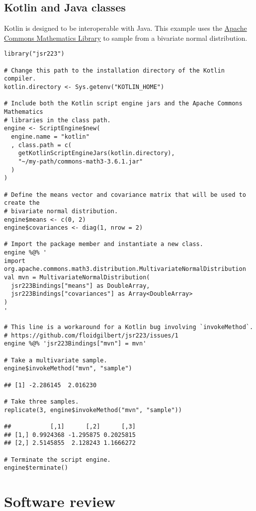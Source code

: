 \documentclass[
article,
11pt, %
a4paper, %
oneside, %
headinclude,footinclude, %
]{scrartcl}
\theoremstyle{definition} %
\theoremstyle{plain} %
\theoremstyle{remark} %
\begin{document}
\subsection{Kotlin and Java classes}

Kotlin is designed to be interoperable with Java. This example uses the \href{http://commons.apache.org/proper/commons-math/}{Apache Commons Mathematics Library} to sample from a bivariate normal distribution.

\begin{verbatim}
library("jsr223")

# Change this path to the installation directory of the Kotlin compiler.
kotlin.directory <- Sys.getenv("KOTLIN_HOME")

# Include both the Kotlin script engine jars and the Apache Commons Mathematics
# libraries in the class path.
engine <- ScriptEngine$new(
  engine.name = "kotlin"
  , class.path = c(
    getKotlinScriptEngineJars(kotlin.directory),
    "~/my-path/commons-math3-3.6.1.jar"
  )
)

# Define the means vector and covariance matrix that will be used to create the
# bivariate normal distribution.
engine$means <- c(0, 2)
engine$covariances <- diag(1, nrow = 2)

# Import the package member and instantiate a new class.
engine %@% '
import org.apache.commons.math3.distribution.MultivariateNormalDistribution
val mvn = MultivariateNormalDistribution(
  jsr223Bindings["means"] as DoubleArray,
  jsr223Bindings["covariances"] as Array<DoubleArray>
)
'

# This line is a workaround for a Kotlin bug involving `invokeMethod`.
# https://github.com/floidgilbert/jsr223/issues/1
engine %@% 'jsr223Bindings["mvn"] = mvn'

# Take a multivariate sample.
engine$invokeMethod("mvn", "sample")

## [1] -2.286145  2.016230

# Take three samples.
replicate(3, engine$invokeMethod("mvn", "sample"))

##           [,1]      [,2]      [,3]
## [1,] 0.9924368 -1.295875 0.2025815
## [2,] 2.5145855  2.128243 1.1666272

# Terminate the script engine.
engine$terminate()
\end{verbatim}

\hypertarget{software-review}{}
\section{Software review}
\end{document}
